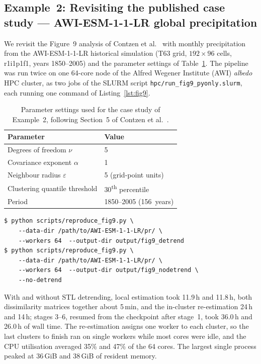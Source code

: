 \documentclass[preprint,12pt,a4paper]{elsarticle}
\newcommand{\rev}[1]{{#1}}
\newcommand{\revb}[1]{{#1}}
\newcommand{\revt}[1]{{#1}}
\begin{document}
\FloatBarrier

\rev{\subsection{Example~2: \revb{Revisiting the published case study} --- AWI-ESM-1-1-LR
  global precipitation}
\label{sec:ex-fig9}}

\rev{We \revb{revisit the Figure~9 analysis} of Contzen et al.~\cite{contzen2025} with
monthly precipitation from the AWI-ESM-1-1-LR
historical simulation (T63 grid, $192 \times 96$ cells, r1i1p1f1,
years 1850--2005) and the parameter settings of
Table~\ref{tab:fig9-params}.} The pipeline was run twice on one
64-core node of the \revt{Alfred Wegener Institute (AWI)}
\emph{albedo} HPC cluster, as two jobs of the SLURM script
\texttt{hpc/run\_fig9\_pyonly.slurm}, each running one command of
Listing~\ref{lst:fig9}.

\begin{table}[ht]
\centering
\begin{tabular}{ll}
\toprule
\textbf{Parameter} & \textbf{Value} \\
\midrule
Degrees of freedom $\nu$ & 5 \\
Covariance exponent $\alpha$ & 1 \\
Neighbour radius $\varepsilon$ & 5 (grid-point units) \\
Clustering quantile threshold & 30\textsuperscript{th} percentile \\
Period & 1850--2005 (156~years) \\
\bottomrule
\end{tabular}
\caption{Parameter settings used for the \revb{case study of Example~2},
  following Section~5 of Contzen et al.~\cite{contzen2025}.}
\label{tab:fig9-params}
\end{table}

\begin{lstlisting}[caption={\revb{Running the case study of Example~2 on HPC}.},
  label=lst:fig9, numbers=none]
$ python scripts/reproduce_fig9.py \
    --data-dir /path/to/AWI-ESM-1-1-LR/pr/ \
    --workers 64  --output-dir output/fig9_detrend
$ python scripts/reproduce_fig9.py \
    --data-dir /path/to/AWI-ESM-1-1-LR/pr/ \
    --workers 64  --output-dir output/fig9_nodetrend \
    --no-detrend
\end{lstlisting}

With and without STL detrending, local estimation took 11.9\,h and
11.8\,h, both dissimilarity matrices together about 5\,min, and the
in-cluster re-estimation 24\,h and 14\,h; stages 3--6, resumed from
the checkpoint after stage~1, took 36.0\,h and 26.0\,h of wall time.
The re-estimation assigns one worker to each cluster, so the last
clusters to finish ran on single workers while most cores were idle,
and the CPU utilisation averaged 35\% and 47\% of the 64 cores. The
largest single process peaked at 36\,GiB and 38\,GiB of resident
memory.
\end{document}
